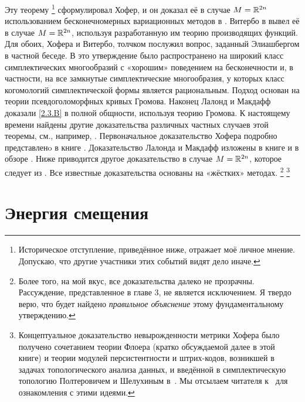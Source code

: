 Эту теорему%
\footnote{Историческое отступление, приведённое ниже, отражает моё личное мнение.
Допускаю, что другие участники этих событий видят дело иначе.}
сформулировал Хофер, и он доказал её в случае $M = \mathbb{R}^{2n}$
использованием бесконечномерных вариационных методов в \cite{H1}.
Витербо в \cite{V1} вывел её в случае $M = \mathbb{R}^{2n}$,
используя разработанную им теорию производящих функций.
Для обоих, Хофера и Витербо, толчком послужил вопрос, заданный
Элиашбергом в частной беседе.
В \cite{P1} это утверждение было распространено на широкий класс
симплектических многообразий с «хорошим» поведением на бесконечности
и, в частности, на все замкнутые симплектические многообразия, у
которых класс когомологий симплектической формы является
рациональным.
Подход \cite{P1} основан на теории псевдоголоморфных кривых Громова.
Наконец \cite{LM1} Лалонд и Макдафф доказали \ref{2.3.B} в полной
общности, используя теорию Громова. 
К настоящему времени найдены другие доказательства различных частных случаев этой теоремы, см., например, \cite{Ch,O3,Sch3}.
Первоначальное доказательство Хофера подробно представленo в книге
\cite{HZ}.
Доказательство Лалонда и Макдафф изложены в книге \cite{MS} и в обзоре \cite{L}.
Ниже приводится другое доказательство в случае $M = \mathbb{R}^{2n}$, которое следует из \cite{P1}.
Все известные доказательства основаны на «жёстких» методах.%
\footnote{Более того, на мой вкус, все доказательства далеко не
  прозрачны.
  Рассуждение, представленное в главе 3, не является исключением.
  Я твердо верю, что будет найдено {}\emph{правильное
    объяснение} этому фундаментальному утверждению.}%
\footnote{  %
  Концептуальное доказательство невырожденности метрики Хофера
  было получено сочетанием теории Флоера (кратко обсуждаемой далее в
  этой книге) и теории модулей персистентности и штрих-кодов, возникшей в
  задачах топологического анализа данных, и введённой в симплектическую
  топологию Полтеровичем и Шелухиным в~\cite{PS16}. Мы отсылаем
  читателя к~\cite{PS16,UZ,PRSZ} для ознакомления с этими
  идеями.\dpp}

\section{Энергия смещения}\label{sec:2.4}

